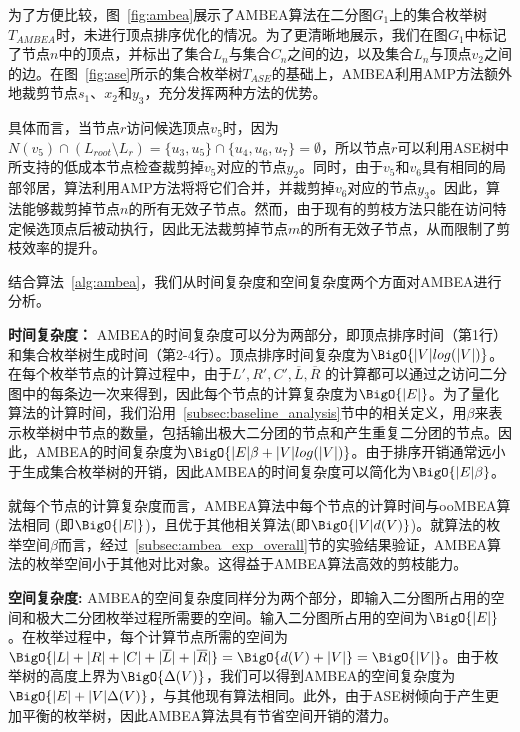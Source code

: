 \begin{example}
  \label{example:ambea}
  为了方便比较，图~\ref{fig:ambea}展示了AMBEA算法在二分图$G_1$上的集合枚举树$T_{AMBEA}$时，未进行顶点排序优化的情况。为了更清晰地展示，我们在图$G_1$中标记了节点$n$中的顶点，并标出了集合$L_n$与集合$C_n$之间的边，以及集合$L_n$与顶点$v_2$之间的边。在图~\ref{fig:ase}所示的集合枚举树$T_{ASE}$的基础上，AMBEA利用AMP方法额外地裁剪节点$s_1$、$x_2$和$y_3$，充分发挥两种方法的优势。

  具体而言，当节点$r$访问候选顶点$v_5$时，因为$N(v_5) \cap (L_{root} \setminus L_r) = \{u_3, u_5\} \cap \{u_4, u_6, u_7\} = \emptyset$，所以节点$r$可以利用ASE树中所支持的低成本节点检查裁剪掉$v_5$对应的节点$y_2$。同时，由于$v_5$和$v_6$具有相同的局部邻居，算法利用AMP方法将将它们合并，并裁剪掉$v_6$对应的节点$y_3$。因此，算法能够裁剪掉节点$n$的所有无效子节点。然而，由于现有的剪枝方法只能在访问特定候选顶点后被动执行，因此无法裁剪掉节点$m$的所有无效子节点，从而限制了剪枝效率的提升。
\end{example}

结合算法~\ref{alg:ambea}，我们从时间复杂度和空间复杂度两个方面对AMBEA进行分析。

\textbf{时间复杂度：} AMBEA的时间复杂度可以分为两部分，即顶点排序时间（第1行）和集合枚举树生成时间（第2-4行）。顶点排序时间复杂度为$\BigO{|V|log(|V|)}$。在每个枚举节点的计算过程中，由于$L', R', C',\overline{L},\overline{R}$ 的计算都可以通过之访问二分图中的每条边一次来得到，因此每个节点的计算复杂度为$\BigO{|E|}$。为了量化算法的计算时间，我们沿用~\ref{subsec:baseline_analysis}节中的相关定义，用$\beta$来表示枚举树中节点的数量，包括输出极大二分团的节点和产生重复二分团的节点。因此，AMBEA的时间复杂度为$\BigO{|E|\beta + |V|log(|V|)}$。由于排序开销通常远小于生成集合枚举树的开销，因此AMBEA的时间复杂度可以简化为$\BigO{|E|\beta}$。

就每个节点的计算复杂度而言，AMBEA算法中每个节点的计算时间与ooMBEA算法相同 (即$\BigO{|E|}$)，且优于其他相关算法(即$\BigO{|V|d(V)}$)。就算法的枚举空间$\beta$而言，经过~\ref{subsec:ambea_exp_overall}节的实验结果验证，AMBEA算法的枚举空间小于其他对比对象。这得益于AMBEA算法高效的剪枝能力。


\textbf{空间复杂度: } AMBEA的空间复杂度同样分为两个部分，即输入二分图所占用的空间和极大二分团枚举过程所需要的空间。输入二分图所占用的空间为$\BigO{|E|}$。在枚举过程中，每个计算节点所需的空间为$\BigO{|L|+|R|+|C|+|\overline{L}| + |\overline{R}|} = \BigO{d(V) + |V|} = \BigO{|V|}$。由于枚举树的高度上界为$\BigO{\Delta(V)}$，我们可以得到AMBEA的空间复杂度为$\BigO{|E|+|V|\Delta(V)}$，与其他现有算法相同。此外，由于ASE树倾向于产生更加平衡的枚举树，因此AMBEA算法具有节省空间开销的潜力。

